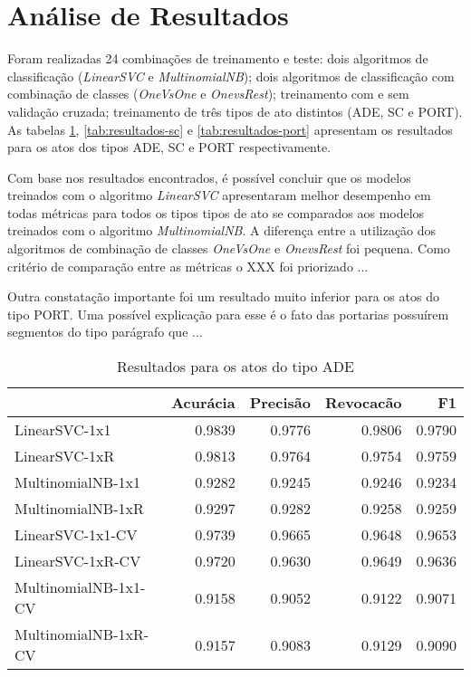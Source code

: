 \section{Análise de Resultados}

Foram realizadas 24 combinações de treinamento e teste: dois algoritmos de classificação (\textit{LinearSVC} e \textit{MultinomialNB}); dois algoritmos de classificação com combinação de classes (\textit{OneVsOne} e \textit{OnevsRest}); treinamento com e sem validação cruzada; treinamento de três tipos de ato distintos (ADE, SC e PORT). As tabelas \ref{tab:resultados-ade}, \ref{tab:resultados-sc} e \ref{tab:resultados-port} apresentam os resultados para os atos dos tipos ADE, SC e PORT respectivamente.

Com base nos resultados encontrados, é possível concluir que os modelos treinados com o algoritmo \textit{LinearSVC} apresentaram melhor desempenho em todas métricas para todos os tipos tipos de ato se comparados aos modelos treinados com o algoritmo \textit{MultinomialNB}. A diferença entre a utilização dos algoritmos de combinação de classes \textit{OneVsOne} e \textit{OnevsRest} foi pequena. Como critério de comparação entre as métricas o XXX foi priorizado ...

Outra constatação importante foi um resultado muito inferior para os atos do tipo PORT. Uma possível explicação para esse é o fato das portarias possuírem segmentos do tipo parágrafo que ...

\begin{table}[h]
\caption{Resultados para os atos do tipo ADE}
\label{tab:resultados-ade}
	\begin{center}
	\begin{tabular}{lrrrr}
		\toprule
		{} &  Acurácia &  Precisão &  Revocacão &      F1 \\
		\midrule
		LinearSVC-1x1        &    0.9839 &    0.9776 &     0.9806 &  0.9790 \\
		LinearSVC-1xR        &    0.9813 &    0.9764 &     0.9754 &  0.9759 \\
		MultinomialNB-1x1    &    0.9282 &    0.9245 &     0.9246 &  0.9234 \\
		MultinomialNB-1xR    &    0.9297 &    0.9282 &     0.9258 &  0.9259 \\
		LinearSVC-1x1-CV     &    0.9739 &    0.9665 &     0.9648 &  0.9653 \\
		LinearSVC-1xR-CV     &    0.9720 &    0.9630 &     0.9649 &  0.9636 \\
		MultinomialNB-1x1-CV &    0.9158 &    0.9052 &     0.9122 &  0.9071 \\
		MultinomialNB-1xR-CV &    0.9157 &    0.9083 &     0.9129 &  0.9090 \\
		\bottomrule
	\end{tabular}
	\end{center}		
\end{table}

